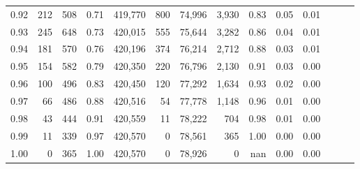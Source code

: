 \begin{tabular}{rrrrrrrrrrrrrr}
0.92 &    212 &    508 &  0.71 &  419,770 &      800 &  74,996 &   3,930 &  0.83 &  0.05 &      0.01 \\
0.93 &    245 &    648 &  0.73 &  420,015 &      555 &  75,644 &   3,282 &  0.86 &  0.04 &      0.01 \\
0.94 &    181 &    570 &  0.76 &  420,196 &      374 &  76,214 &   2,712 &  0.88 &  0.03 &      0.01 \\
0.95 &    154 &    582 &  0.79 &  420,350 &      220 &  76,796 &   2,130 &  0.91 &  0.03 &      0.00 \\
0.96 &    100 &    496 &  0.83 &  420,450 &      120 &  77,292 &   1,634 &  0.93 &  0.02 &      0.00 \\
0.97 &     66 &    486 &  0.88 &  420,516 &       54 &  77,778 &   1,148 &  0.96 &  0.01 &      0.00 \\
0.98 &     43 &    444 &  0.91 &  420,559 &       11 &  78,222 &     704 &  0.98 &  0.01 &      0.00 \\
0.99 &     11 &    339 &  0.97 &  420,570 &        0 &  78,561 &     365 &  1.00 &  0.00 &      0.00 \\
1.00 &      0 &    365 &  1.00 &  420,570 &        0 &  78,926 &       0 &   nan &  0.00 &      0.00 \\
\bottomrule
\end{tabular}
